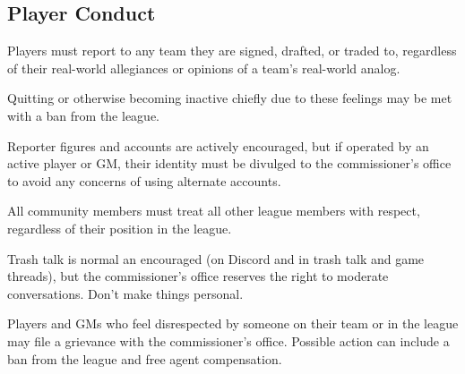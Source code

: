 \subsection{Player Conduct}
\begin{deepEnumerate}
	\item Players must report to any team they are signed, drafted, or traded to, regardless of their real-world allegiances or opinions of a team's real-world analog.
	\begin{deepEnumerate}
		\item Quitting or otherwise becoming inactive chiefly due to these feelings	may be met with a ban from the league.
	\end{deepEnumerate}
	\item Reporter figures and accounts are actively encouraged,
	\label{sec:reporters}
	but if operated by an active player or GM, their identity must be divulged to the commissioner's office	to avoid any concerns of using alternate accounts.
	\item All community members must treat all other league members with respect, regardless of their position in the league.
	\begin{deepEnumerate}
		\item Trash talk is normal an encouraged (on Discord and in trash talk and game threads), but the commissioner's office reserves the right to moderate conversations.
		Don't make things personal.
		\item Players and GMs who feel disrespected by someone on their team or in the league may file a grievance with the commissioner's office.
		Possible action can include a ban from the league and free agent compensation.
	\end{deepEnumerate}
\end{deepEnumerate}